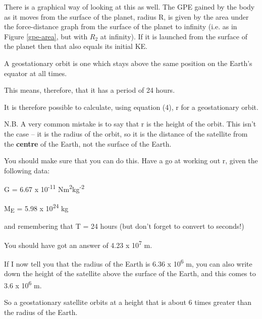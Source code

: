 \documentclass[revision-guide.tex]{subfiles}
\begin{document}
There is a graphical way of looking at this as well. The GPE gained by
the body as it moves from the surface of the planet, radius R, is given
by the area under the force-distance graph from the surface of the
planet to infinity (i.e. as in Figure \ref{gpe-area}, but with $R_2$ at infinity). If it is launched from the surface of the planet
then that also equals its initial KE.


A geostationary orbit is one which stays above the same position on the
Earth's equator at all times.

This means, therefore, that it has a period of 24 hours.

It is therefore possible to calculate, using equation (4), r for a
geostationary orbit.

N.B. A very common mistake is to say that r is the height of the orbit.
This isn't the case -- it is the radius of the orbit, so it is the
distance of the satellite from the \textbf{centre} of the Earth, not the
surface of the Earth.

You should make sure that you can do this. Have a go at working out r,
given the following data:

G = 6.67 x 10\textsuperscript{-11}
Nm\textsuperscript{2}kg\textsuperscript{-2}

M\textsubscript{E} = 5.98 x 10\textsuperscript{24} kg

and remembering that T = 24 hours (but don't forget to convert to
seconds!)

You should have got an answer of 4.23 x 10\textsuperscript{7} m.

If I now tell you that the radius of the Earth is
6.36 x 10\textsuperscript{6} m, you can also write down the height of the
satellite above the surface of the Earth, and this comes to
3.6 x 10\textsuperscript{6} m.

So a geostationary satellite orbits at a height that is about 6 times
greater than the radius of the Earth.
\end{document}
